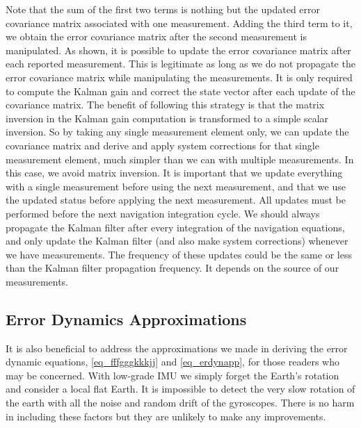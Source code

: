 \documentclass[journal]{IEEEtran}
\begin{document}
Note that the sum of the first two terms is nothing but the updated error covariance matrix associated with one measurement. Adding the third term to it, we obtain the error covariance matrix after the second measurement is manipulated. As shown, it is  possible to update the error covariance matrix after each reported measurement. This is legitimate as long as we do not propagate the error covariance matrix while manipulating the measurements. It is only required to compute the Kalman gain and correct the state vector after each update of the covariance matrix. The benefit of following this strategy is that the matrix inversion in the Kalman gain computation is transformed to a simple scalar inversion. So by taking any single measurement element only, we can update the covariance matrix and derive and apply system corrections for that single measurement element, much simpler than we can with multiple measurements. In this case, we avoid matrix inversion. It is important that we update everything with a single measurement before using the next measurement, and that we use the updated status before applying the next measurement. All updates must be performed before the next navigation integration cycle. We should always propagate the Kalman filter after every integration of the navigation equations, and  only  update  the  Kalman  filter  (and  also  make  system  corrections)  whenever  we  have  measurements.  The frequency of these updates could be the same or less than the Kalman filter propagation frequency. It depends on the source of our measurements. 



%
\subsection{Error Dynamics Approximations}
It is also beneficial to address the approximations we made in deriving the error dynamic equations,
\eqref{eq_fffgggkkkjj} and \eqref{eq_erdynapp}, for  those readers who may be concerned. With low-grade IMU we simply forget the Earth's rotation and consider a local flat Earth. It is impossible to detect the very slow rotation of the earth with all the noise and random drift of the gyroscopes. There is no harm in including these factors but they are unlikely to make any improvements.\par
\end{document}
